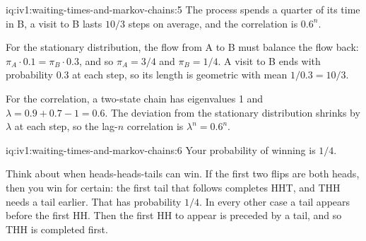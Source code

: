 \begin{solution}{iq:iv1:waiting-times-and-markov-chains:5}
The process spends a quarter of its time in B, a visit to B lasts $10/3$ steps on average, and the correlation is $0.6^n$.

For the stationary distribution, the flow from A to B must balance the flow back: $\pi_A \cdot 0.1 = \pi_B \cdot 0.3$, and so $\pi_A = 3/4$ and $\pi_B = 1/4$. A visit to B ends with probability $0.3$ at each step, so its length is geometric with mean $1/0.3 = 10/3$.

For the correlation, a two-state chain has eigenvalues 1 and $\lambda = 0.9 + 0.7 - 1 = 0.6$. The deviation from the stationary distribution shrinks by $\lambda$ at each step, so the lag-$n$ correlation is $\lambda^n = 0.6^n$.

\end{solution}

\begin{solution}{iq:iv1:waiting-times-and-markov-chains:6}
Your probability of winning is $1/4$.

Think about when heads-heads-tails can win. If the first two flips are both heads, then you win for certain: the first tail that follows completes HHT, and THH needs a tail earlier. That has probability $1/4$. In every other case a tail appears before the first HH. Then the first HH to appear is preceded by a tail, and so THH is completed first.

\end{solution}

